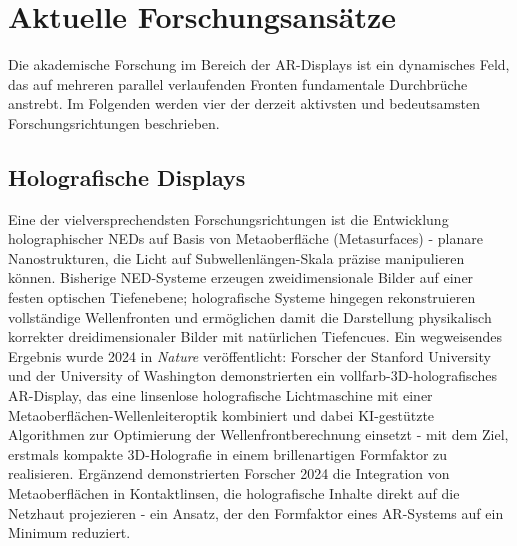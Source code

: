 \section{Aktuelle Forschungsansätze}
\label{sec:aktuelleforschungsansätze}
Die akademische Forschung im Bereich der \ac{AR}-Displays ist ein dynamisches Feld, das auf mehreren parallel verlaufenden Fronten fundamentale Durchbrüche anstrebt. Im Folgenden werden vier der derzeit aktivsten und bedeutsamsten Forschungsrichtungen beschrieben.

\subsection{Holografische Displays}
\label{subsec:holografischedisplay}
Eine der vielversprechendsten Forschungsrichtungen ist die Entwicklung holographischer \ac{NED}s auf Basis von Metaoberfläche (Metasurfaces) - planare Nanostrukturen, die Licht auf Subwellenlängen-Skala präzise manipulieren können. Bisherige \ac{NED}-Systeme erzeugen zweidimensionale Bilder auf einer festen optischen Tiefenebene; holografische Systeme hingegen rekonstruieren vollständige Wellenfronten und ermöglichen damit die Darstellung physikalisch korrekter dreidimensionaler Bilder mit natürlichen Tiefencues. 
\newpage
Ein wegweisendes Ergebnis wurde 2024 in \textit{Nature} veröffentlicht: Forscher der Stanford University und der University of Washington demonstrierten ein vollfarb-3D-holografisches \ac{AR}-Display, das eine linsenlose holografische Lichtmaschine mit einer Metaoberflächen-Wellenleiteroptik kombiniert und dabei \ac{KI}-gestützte Algorithmen zur Optimierung der Wellenfrontberechnung einsetzt - mit dem Ziel, erstmals kompakte 3D-Holografie in einem brillenartigen Formfaktor zu realisieren. Ergänzend demonstrierten Forscher 2024 die Integration von Metaoberflächen in Kontaktlinsen, die holografische Inhalte direkt auf die Netzhaut projezieren - ein Ansatz, der den Formfaktor eines \ac{AR}-Systems auf ein Minimum reduziert.

